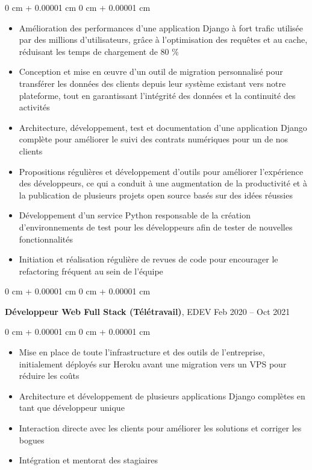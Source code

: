 \documentclass[10pt, letterpaper]{article}
\newenvironment{highlights}{
    \begin{itemize}[
        topsep=0.10 cm,
        parsep=0.10 cm,
        partopsep=0pt,
        itemsep=0pt,
        leftmargin=0 cm + 10pt
    ]
}{
    \end{itemize}
} %
\newenvironment{onecolentry}{
    \begin{adjustwidth}{
        0 cm + 0.00001 cm
    }{
        0 cm + 0.00001 cm
    }
}{
    \end{adjustwidth}
} %
\newenvironment{twocolentry}[2][]{
    \onecolentry
    \def\secondColumn{#2}
    \setcolumnwidth{\fill, 4.5 cm}
    \begin{paracol}{2}
}{
    \switchcolumn \raggedleft \secondColumn
    \end{paracol}
    \endonecolentry
} %
\begin{document}
        \vspace{0.10 cm}
        \begin{onecolentry}
            \begin{highlights}
                \item Amélioration des performances d'une application Django à fort trafic utilisée par des millions d'utilisateurs, grâce à l'optimisation des requêtes et au cache, réduisant les temps de chargement de 80 \%
                \item Conception et mise en œuvre d'un outil de migration personnalisé pour transférer les données des clients depuis leur système existant vers notre plateforme, tout en garantissant l'intégrité des données et la continuité des activités
                \item Architecture, développement, test et documentation d'une application Django complète pour améliorer le suivi des contrats numériques pour un de nos clients
                \item Propositions régulières et développement d'outils pour améliorer l'expérience des développeurs, ce qui a conduit à une augmentation de la productivité et à la publication de plusieurs projets open source basés sur des idées réussies
                \item Développement d'un service Python responsable de la création d'environnements de test pour les développeurs afin de tester de nouvelles fonctionnalités
                \item Initiation et réalisation régulière de revues de code pour encourager le refactoring fréquent au sein de l'équipe
            \end{highlights}
        \end{onecolentry}


        \vspace{0.2 cm}

        \begin{twocolentry}{
            Feb 2020 – Oct 2021
        }
            \textbf{Développeur Web Full Stack (Télétravail)}, EDEV\end{twocolentry}

        \vspace{0.10 cm}
        \begin{onecolentry}
            \begin{highlights}
                \item Mise en place de toute l'infrastructure et des outils de l'entreprise, initialement déployés sur Heroku avant une migration vers un VPS pour réduire les coûts
                \item Architecture et développement de plusieurs applications Django complètes en tant que développeur unique
                \item Interaction directe avec les clients pour améliorer les solutions et corriger les bogues
                \item Intégration et mentorat des stagiaires
            \end{highlights}
        \end{onecolentry}
\end{document}
